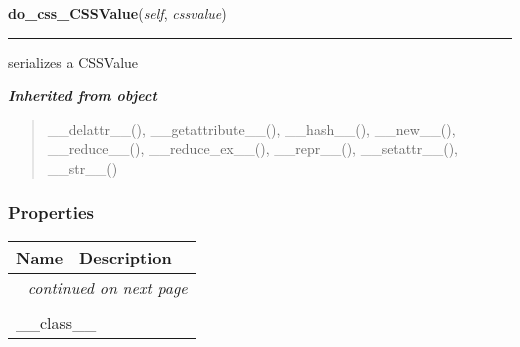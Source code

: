     \label{cssutils:serialize:CSSSerializer:do_css_CSSValue}

    \vspace{0.5ex}

\hspace{.8\funcindent}\begin{boxedminipage}{\funcwidth}

    \raggedright \textbf{do\_css\_CSSValue}(\textit{self}, \textit{cssvalue})

    \vspace{-1.5ex}

    \rule{\textwidth}{0.5\fboxrule}
\setlength{\parskip}{2ex}

serializes a CSSValue
\setlength{\parskip}{1ex}
    \end{boxedminipage}


\large{\textbf{\textit{Inherited from object}}}

\begin{quote}
\_\_delattr\_\_(), \_\_getattribute\_\_(), \_\_hash\_\_(), \_\_new\_\_(), \_\_reduce\_\_(), \_\_reduce\_ex\_\_(), \_\_repr\_\_(), \_\_setattr\_\_(), \_\_str\_\_()
\end{quote}


  \subsubsection{Properties}

    \vspace{-1cm}
\hspace{\varindent}\begin{longtable}{|p{\varnamewidth}|p{\vardescrwidth}|l}
\cline{1-2}
\cline{1-2} \centering \textbf{Name} & \centering \textbf{Description}& \\
\cline{1-2}
\endhead\cline{1-2}\multicolumn{3}{r}{\small\textit{continued on next page}}\\\endfoot\cline{1-2}
\endlastfoot\multicolumn{2}{|l|}{\textit{Inherited from object}}\\
\multicolumn{2}{|p{\varwidth}|}{\raggedright \_\_class\_\_}\\
\cline{1-2}
\end{longtable}


